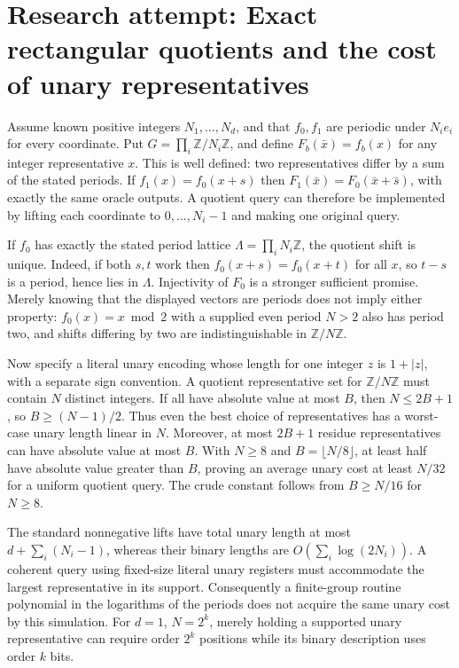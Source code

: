 \documentclass[11pt]{article}
\begin{document}
\section{Research attempt: Exact rectangular quotients and the cost of unary representatives}
Assume known positive integers $N_1,\ldots,N_d$, and that $f_0,f_1$ are periodic under $N_i e_i$ for every coordinate. Put $G=\prod_i\mathbb Z/N_i\mathbb Z$, and define $F_b(\bar x)=f_b(x)$ for any integer representative $x$. This is well defined: two representatives differ by a sum of the stated periods. If $f_1(x)=f_0(x+s)$ then $F_1(\bar x)=F_0(\bar x+\bar s)$, with exactly the same oracle outputs. A quotient query can therefore be implemented by lifting each coordinate to $0,\ldots,N_i-1$ and making one original query.

If $f_0$ has exactly the stated period lattice $\Lambda=\prod_iN_i\mathbb Z$, the quotient shift is unique. Indeed, if both $s,t$ work then $f_0(x+s)=f_0(x+t)$ for all $x$, so $t-s$ is a period, hence lies in $\Lambda$. Injectivity of $F_0$ is a stronger sufficient promise. Merely knowing that the displayed vectors are periods does not imply either property: $f_0(x)=x\bmod2$ with a supplied even period $N>2$ also has period two, and shifts differing by two are indistinguishable in $\mathbb Z/N\mathbb Z$.

Now specify a literal unary encoding whose length for one integer $z$ is $1+|z|$, with a separate sign convention. A quotient representative set for $\mathbb Z/N\mathbb Z$ must contain $N$ distinct integers. If all have absolute value at most $B$, then $N\leq2B+1$, so $B\geq(N-1)/2$. Thus even the best choice of representatives has a worst-case unary length linear in $N$. Moreover, at most $2B+1$ residue representatives can have absolute value at most $B$. With $N\geq8$ and $B=\lfloor N/8\rfloor$, at least half have absolute value greater than $B$, proving an average unary cost at least $N/32$ for a uniform quotient query. The crude constant follows from $B\geq N/16$ for $N\geq8$.

The standard nonnegative lifts have total unary length at most $d+\sum_i(N_i-1)$, whereas their binary lengths are $O(\sum_i\log(2N_i))$. A coherent query using fixed-size literal unary registers must accommodate the largest representative in its support. Consequently a finite-group routine polynomial in the logarithms of the periods does not acquire the same unary cost by this simulation. For $d=1$, $N=2^k$, merely holding a supported unary representative can require order $2^k$ positions while its binary description uses order $k$ bits.
\end{document}
